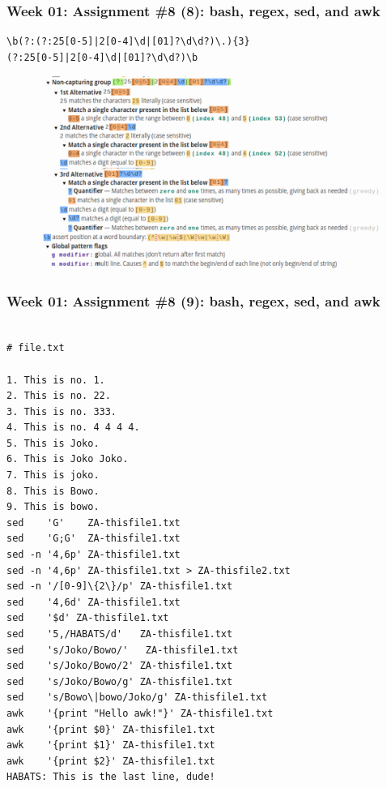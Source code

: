 \documentclass[xcolor=table, notheorems, hyperref={pdfpagelabels=false}]{beamer}
\begin{document}
\begin{frame}[fragile]
\frametitle{Week 01: Assignment \#8 (8): bash, regex, sed, and awk}

\begin{verbatim}
\b(?:(?:25[0-5]|2[0-4]\d|[01]?\d\d?)\.){3}
(?:25[0-5]|2[0-4]\d|[01]?\d\d?)\b
\end{verbatim}

\begin{figure}
\includegraphics[width=0.96\linewidth]{os-regex2}
\end{figure}
\end{frame}

\begin{frame}[fragile]
\frametitle{Week 01: Assignment \#8 (9): bash, regex, sed, and awk}
\begin{lstlisting}[basicstyle=\ttfamily\tiny]

# file.txt

1. This is no. 1.
2. This is no. 22.
3. This is no. 333.  
4. This is no. 4 4 4 4.
5. This is Joko.
6. This is Joko Joko.
7. This is joko.
8. This is Bowo.
9. This is bowo.
sed    'G'    ZA-thisfile1.txt
sed    'G;G'  ZA-thisfile1.txt
sed -n '4,6p' ZA-thisfile1.txt
sed -n '4,6p' ZA-thisfile1.txt > ZA-thisfile2.txt
sed -n '/[0-9]\{2\}/p' ZA-thisfile1.txt
sed    '4,6d' ZA-thisfile1.txt
sed    '$d' ZA-thisfile1.txt
sed    '5,/HABATS/d'   ZA-thisfile1.txt
sed    's/Joko/Bowo/'   ZA-thisfile1.txt
sed    's/Joko/Bowo/2' ZA-thisfile1.txt
sed    's/Joko/Bowo/g' ZA-thisfile1.txt
sed    's/Bowo\|bowo/Joko/g' ZA-thisfile1.txt
awk    '{print "Hello awk!"}' ZA-thisfile1.txt
awk    '{print $0}' ZA-thisfile1.txt
awk    '{print $1}' ZA-thisfile1.txt
awk    '{print $2}' ZA-thisfile1.txt
HABATS: This is the last line, dude!

\end{lstlisting}
\end{frame}
\end{document}
